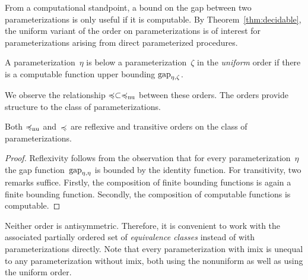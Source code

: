 From a computational standpoint, a bound on the gap between two parameterizations is only useful if it is computable.
By Theorem~\ref{thm:decidable}, the uniform variant of the order on parameterizations is of interest for parameterizations arising from direct parameterized procedures.

\begin{definition}
\label{def:uniform_order}%
  A parameterization~$\eta$ is below a parameterization~$\zeta$ in the \emph{uniform} order  if there is a computable function upper bounding $\operatorname{gap}_{\eta, \zeta}$.
\end{definition}

We observe the relationship $\preccurlyeq \subset \preccurlyeq_\mathrm{nu}$ between these orders.
The orders provide structure to the class of parameterizations.
\begin{lemma}
\label{lem:preorder}%
  Both $\preccurlyeq_\mathrm{nu}$ and~$\preccurlyeq$ are reflexive and transitive orders on the class of parameterizations.
\end{lemma}
\begin{proof}
  Reflexivity follows from the observation that for every parameterization~$\eta$ the gap function~$\operatorname{gap}_{\eta, \eta}$ is bounded by the identity function.
  For transitivity, two remarks suffice.
  Firstly, the composition of finite bounding functions is again a finite bounding function.
  Secondly, the composition of computable functions is computable.
\end{proof}

Neither order is antisymmetric.
Therefore, it is convenient to work with the associated partially ordered set of \emph{equivalence classes} instead of with parameterizations directly.
Note that every parameterization with imix is unequal to any parameterization without imix, both using the nonuniform as well as using the uniform order.

